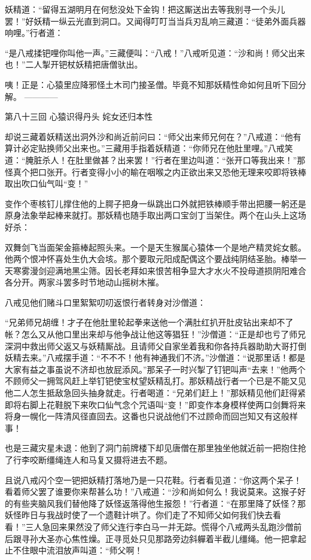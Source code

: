 \documentclass[12pt,UTF8]{ctexbook}
\begin{document}
{	妖精道：“留得五湖明月在何愁没处下金钩！把这厮送出去等我别寻一个头儿罢！”好妖精一纵云光直到洞口。又闻得叮叮当当兵刃乱响三藏道：“徒弟外面兵器响哩。”行者道：
	
	“是八戒揉钯哩你叫他一声。”三藏便叫：“八戒！”八戒听见道：“沙和尚！师父出来也！”二人掣开钯杖妖精把唐僧驮出。
	
	咦！正是：心猿里应降邪怪土木司门接圣僧。毕竟不知那妖精性命如何且听下回分解。
	------------
	
	第八十三回 心猿识得丹头 姹女还归本性
	
	却说三藏着妖精送出洞外沙和尚近前问曰：“师父出来师兄何在？”八戒道：“他有算计必定贴换师父出来也。”三藏用手指着妖精道：“你师兄在他肚里哩。”八戒笑道：“腌脏杀人！在肚里做甚？出来罢！”行者在里边叫道：“张开口等我出来！”那怪真个把口张开。行者变得小小的睮在咽喉之内正欲出来又恐他无理来咬即将铁棒取出吹口仙气叫“变！”
	
	变作个枣核钉儿撑住他的上腭子把身一纵跳出口外就把铁棒顺手带出把腰一躬还是原身法象举起棒来就打。那妖精也随手取出两口宝剑丁当架住。两个在山头上这场好杀：
	
	双舞剑飞当面架金箍棒起照头来。一个是天生猴属心猿体一个是地产精灵姹女骸。他两个恨冲怀喜处生仇大会垓。那个要取元阳成配偶这个要战纯阴结圣胎。棒举一天寒雾漫剑迎满地黑尘筛。因长老拜如来恨苦相争显大才水火不投母道损阴阳难合各分开。两家斗罢多时节地动山摇树木摧。
	
	八戒见他们赌斗口里絮絮叨叨返恨行者转身对沙僧道：
	
	“兄弟师兄胡缠！才子在他肚里轮起拳来送他一个满肚红扒开肚皮钻出来却不了帐？怎么又从他口里出来却与他争战让他这等猖狂！”沙僧道：“正是却也亏了师兄深洞中救出师父返又与妖精厮战。且请师父自家坐着我和你各持兵器助助大哥打倒妖精去来。”八戒摆手道：“不不不！他有神通我们不济。”沙僧道：“说那里话！都是大家有益之事虽说不济却也放屁添风。”那呆子一时兴掣了钉钯叫声“去来！”他两个不顾师父一拥驾风赶上举钉钯使宝杖望妖精乱打。那妖精战行者一个已是不能又见他二人怎生抵敌急回头抽身就走。行者喝道：“兄弟们赶上！”那妖精见他们赶得紧即将右脚上花鞋脱下来吹口仙气念个咒语叫“变！”即变作本身模样使两口剑舞将来将身一幌化一阵清风径直回去。这番也只说战他们不过顾命而回岂知又有这般样事！
	
	也是三藏灾星未退：他到了洞门前牌楼下却见唐僧在那里独坐他就近前一把抱住抢了行李咬断缰绳连人和马复又摄将进去不题。
	
	且说八戒闪个空一钯把妖精打落地乃是一只花鞋。行者看见道：“你这两个呆子！看着师父罢了谁要你来帮甚么功！”八戒道：“沙和尚如何么！我说莫来。这猴子好的有些夹脑风我们替他降了妖怪返落得他生报怨！”行者道：“在那里降了妖怪？那妖怪昨日与我战时使了一个遗鞋计哄了。你们走了不知师父如何我们快去看看！”三人急回来果然没了师父连行李白马一并无踪。慌得个八戒两头乱跑沙僧前后跟寻孙大圣亦心焦性燥。正寻觅处只见那路旁边斜軃着半截儿缰绳。他一把拿起止不住眼中流泪放声叫道：“师父啊！
	
}
\end{document}
